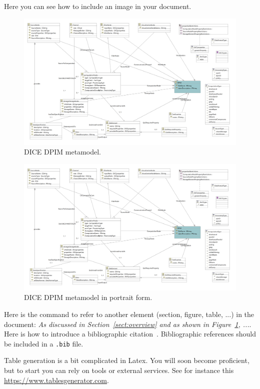 Here you can see how to include an image in your document.

\begin{figure}
\centering
\includegraphics[width=\textwidth]{Images/11.png}
\caption{\label{fig:metamodel}DICE DPIM metamodel.}
\end{figure}

\begin{figure}
\centering
\includegraphics[width=\textwidth]{Images/11.png}
\caption{\label{fig:metamodel2}DICE DPIM metamodel in portrait form.}
\end{figure}

Here is the command to refer to another element (section, figure, table, ...) in the document: \emph{As discussed in Section~\ref{sect:overview} and as shown in Figure~\ref{fig:metamodel}, ...}. Here is how to introduce a bibliographic citation~\cite{DAM}. Bibliographic references should be included in a \texttt{.bib} file. 

Table generation is a bit complicated in Latex. You will soon become proficient, but to start you can rely on tools or external services. See for instance this \href{https://www.tablesgenerator.com}{https://www.tablesgenerator.com}. 


